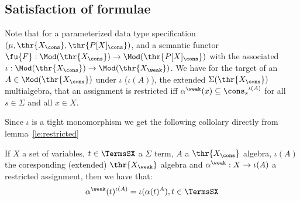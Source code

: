 \subsection{Satisfaction of formulae}


Note that for a parameterized data type specification
$(\mu,\thr{X_\cons},\thr{P[X]_\cons})$, and a semantic functor
$\fu{F}:\Mod(\thr{X_\cons}) \to \Mod(\thr{P[X]_\cons})$ with the associated
$\iota:\Mod(\thr{X_\cons})\to\Mod(\thr{X_\weak})$. We have for the target of an
$A\in\Mod(\thr{X_\cons})$ under $\iota$ ($\iota(A)$), the extended $\Sigma(\thr{X_\cons})$ multialgebra, that an assignment is restricted iff $\alpha^{\weak}(x) \subseteq {\cons_s}^{\iota(A)}$ for all $s \in \Sigma$ and all $x \in X$.





Since $\iota$ is a tight monomorphism we get the following collolary directly from lemma~\ref{le:restricted}

\begin{corollary}
\label{co:restricted}
If $X$ a set of variables, $t \in \TermsSX$ a $\Sigma$ term, $A$ a $\thr{X_\cons}$
	algebra, $\iota(A)$ the coresponding (extended) $\thr{X_{\weak}}$
	algebra and $\alpha^{\weak}: X \to \iota(A)$ a restricted
	assignment, then we have that: \[ \alpha^{\weak}(t)^{\iota(A)} =
	\iota(\alpha(t)^{A}), t \in \TermsSX \]
\end{corollary}

